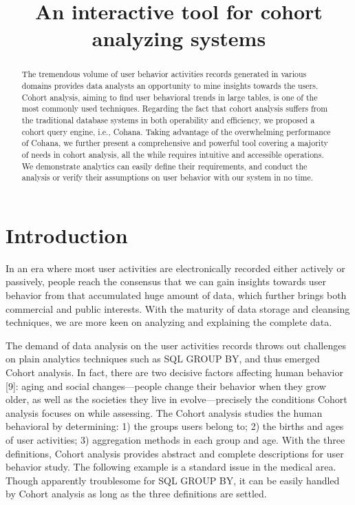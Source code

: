 \documentclass[10pt,conference,letterpaper]{IEEEtran}
\title{An interactive tool for cohort analyzing systems}
\begin{document}
\maketitle
%
\begin{abstract} 
The tremendous volume of user behavior activities records generated in various domains provides data analysts an opportunity to mine insights towards the users. Cohort analysis, aiming to find user behavioral trends in large tables, is one of the most commonly used techniques. Regarding the fact that cohort analysis suffers from the traditional database systems in both operability and efficiency, we proposed a cohort query engine, i.e., Cohana. Taking advantage of the overwhelming performance of Cohana, we further present a comprehensive and powerful tool covering a majority of needs in cohort analysis, all the while requires intuitive and accessible operations. We demonstrate analytics can easily define their requirements, and conduct the analysis or verify their assumptions on user behavior with our system in no time.
\end{abstract}

%
\section{Introduction}
%
In an era where most user activities are electronically recorded either actively or passively, people reach the consensus that we can gain insights towards user behavior from that accumulated huge amount of data, which further brings both commercial and public interests. With the maturity of data storage and cleansing techniques, we are more keen on analyzing and explaining the complete data.

The demand of data analysis on the user activities records throws out challenges on plain analytics techniques such as SQL GROUP BY, and thus emerged Cohort analysis. In fact, there are two decisive factors affecting human behavior [9]: aging and social changes---people change their behavior when they grow older, as well as the societies they live in evolve---precisely the conditions Cohort analysis focuses on while assessing. The Cohort analysis studies the human behavioral by determining: 1) the groups users belong to; 2) the births and ages of user activities; 3) aggregation methods in each group and age. With the three definitions, Cohort analysis provides abstract and complete descriptions for user behavior study. The following example is a standard issue in the medical area. Though apparently troublesome for SQL GROUP BY, it can be easily handled by Cohort analysis as long as the three definitions are settled.
\end{document}

